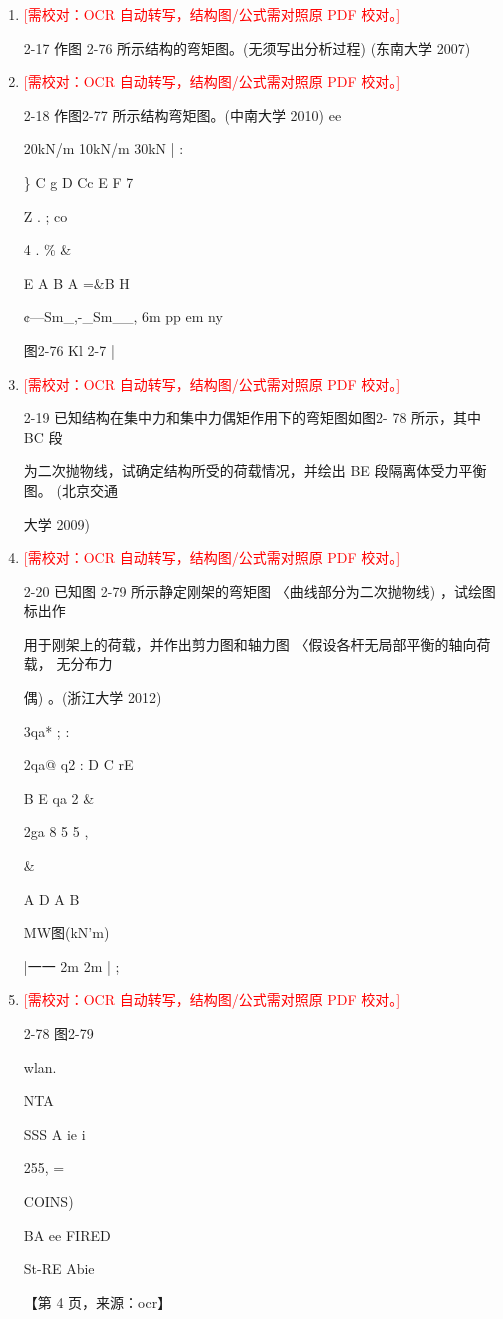 \documentclass[UTF8,12pt,a4paper,openany]{ctexbook}
\newcommand{\TODO}[1]{\textcolor{red}{[需校对：#1]}}
\begin{document}
\begin{enumerate}[label=\textbf{\arabic*.},leftmargin=2em]
\item \TODO{OCR 自动转写，结构图/公式需对照原 PDF 校对。}\par 2-17 作图 2-76 所示结构的弯矩图。(无须写出分析过程) (东南大学 2007)
\item \TODO{OCR 自动转写，结构图/公式需对照原 PDF 校对。}\par 2-18 作图2-77 所示结构弯矩图。(中南大学 2010)      ee\par 20kN/m                                10kN/m           30kN |              :\par \}     C       g       D    Cc    E      F         7\par Z    .                ;                     co\par 4                     .                       \%         \&\par E     A        B            A       =\&B          H\par ¢—Sm\_,-\_Sm\_\_, 6m   pp em ny\par 图2-76                         Kl 2-7   |
\item \TODO{OCR 自动转写，结构图/公式需对照原 PDF 校对。}\par 2-19 已知结构在集中力和集中力偶矩作用下的弯矩图如图2- 78 所示，其中 BC 段\par 为二次抛物线，试确定结构所受的荷载情况，并绘出 BE 段隔离体受力平衡图。 (北京交通\par 大学 2009)
\item \TODO{OCR 自动转写，结构图/公式需对照原 PDF 校对。}\par 2-20 已知图 2-79 所示静定刚架的弯矩图 〈曲线部分为二次抛物线) ，试绘图标出作\par 用于刚架上的荷载，并作出剪力图和轴力图 〈假设各杆无局部平衡的轴向荷载， 无分布力\par 偶) 。(浙江大学 2012)\par 3qa*                      ;                               :\par 2qa@           q2             : D     C     rE\par B    E     qa                          2  \&\par 2ga        8                 5 5      ,\par \&\par A        D                A          B\par MW图(kN'm)\par |一一                   2m     2m   |   ;
\item \TODO{OCR 自动转写，结构图/公式需对照原 PDF 校对。}\par 2-78                              图2-79\par wlan.\par NTA\par SSS A ie i\par 255, =\par COINS)\par BA ee FIRED\par St-RE Abie\par \par 【第 4 页，来源：ocr】

\end{enumerate}
\end{document}
